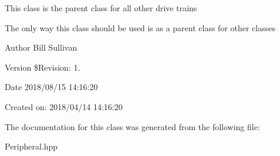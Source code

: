 This class is the parent class for all other drive trains

The only way this class should be used is as a parent class for other classes

\begin{DoxyAuthor}{Author}
Bill Sullivan
\end{DoxyAuthor}
\begin{DoxyVersion}{Version}
\$\+Revision\+: 1.
\end{DoxyVersion}
\begin{DoxyDate}{Date}
2018/08/15 14\+:16\+:20
\end{DoxyDate}
Created on\+: 2018/04/14 14\+:16\+:20 

The documentation for this class was generated from the following file\+:\begin{DoxyCompactItemize}
\item 
Peripheral.\+hpp\end{DoxyCompactItemize}
